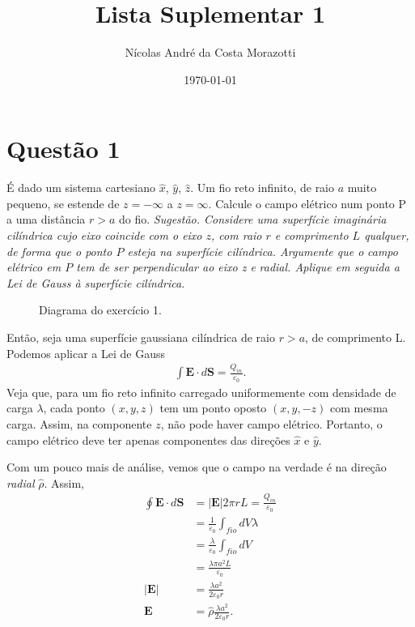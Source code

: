 \documentclass[11pt]{article}
\author{Nícolas André da Costa Morazotti}
\date{\today}
\title{Lista Suplementar 1}
\begin{document}
\maketitle
\section{Questão 1}
\label{sec:org63e7e84}
É dado um sistema cartesiano \(\hat x\), \(\hat y\), \(\hat z\). Um fio reto
infinito, de raio \(a\) muito pequeno, se estende de \(z=-\infty\) a
\(z=\infty\). Calcule o campo elétrico num ponto P a uma distância \(r>a\) do
fio. \emph{Sugestão. Considere uma superfície imaginária cilíndrica cujo}
\emph{eixo coincide com o eixo \(z\), com raio \(r\) e comprimento \(L\) qualquer,}
\emph{de forma que o ponto \(P\) esteja na superfície cilíndrica. Argumente que o}
\emph{campo elétrico em \(P\) tem de ser perpendicular ao eixo z e}
\emph{radial. Aplique em seguida a Lei de Gauss à superfície cilíndrica.}

\begin{figure}[h!]
  \centering
  \caption{Diagrama do exercício 1.}
  \label{fig:ex-1}
\end{figure}

Então, seja uma superfície gaussiana cilíndrica de raio \(r>a\), de
comprimento L. Podemos aplicar a Lei de Gauss
\begin{align*}
  \int \mathbf{E}\cdot d\mathbf{S} = \frac{Q_{in}}{\varepsilon_0}.
\end{align*}
Veja que, para um fio reto infinito carregado uniformemente com
densidade de carga \(\lambda\), cada ponto \((x,y,z)\) tem um ponto oposto
\((x,y,-z)\) com mesma carga. Assim, na componente \(z\), não pode haver
campo elétrico. Portanto, o campo elétrico deve ter apenas componentes
das direções \(\hat x\) e \(\hat y\).

Com um pouco mais de análise, vemos que o campo na verdade é na direção
\emph{radial} \(\hat\rho\). Assim,
\begin{align}
  \label{eq:1}
  \oint\mathbf E\cdot d\mathbf S &= |\mathbf E| 2\pi rL = \frac{Q_{in}}{\varepsilon_0}\\
                         &= \frac 1{\varepsilon_0}\int_{fio} dV \lambda\\
                         &= \frac {\lambda}{\varepsilon_0}\int_{fio} dV\\
                         &= \frac{\lambda\pi a^2L}{\varepsilon_0}\\
  |\mathbf E| &= \frac{\lambda a^2}{2\varepsilon_0 r}\\
  \mathbf E &= \hat\rho\frac{\lambda a^2}{2\varepsilon_0 r}.
\end{align}
\end{document}
